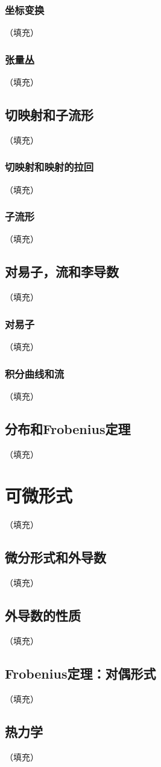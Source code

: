 \documentclass[hyperref,UTF8]{ctexbook}
\begin{document}
\subsection{坐标变换}（填充）
\subsection{张量丛}（填充）
\section{切映射和子流形}（填充）
\subsection{切映射和映射的拉回}（填充）
\subsection{子流形}（填充）
\section{对易子，流和李导数}（填充）
\subsection{对易子}（填充）
\subsection{积分曲线和流}（填充）
\section{分布和Frobenius定理}（填充）
\chapter{可微形式}（填充）
\section{微分形式和外导数}（填充）
\section{外导数的性质}（填充）
\section{Frobenius定理：对偶形式}（填充）
\section{热力学}（填充）
\end{document}
